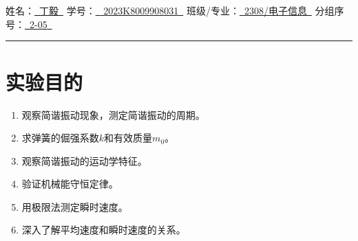 \documentclass[UTF8]{article}
\theoremstyle{MyLineTheoremStyle} %
\theoremstyle{MyBlockTheoremStyle} %
\theoremstyle{MySubsubsectionStyle} %
\begin{document}
\begin{center}\large
    \vspace*{-0.9cm}
    \\\vspace{0.5mm}
    \\\vspace{0.1cm}
    \noindent
    {
    姓名：\uline{\,\,\,丁毅\,\,\,}\hspace{0.2cm}
    学号：\uline{\,\,\,{ 2023K8009908031}\,\,\,}\hspace{0.2cm}
    班级/专业：\uline{\,\,\,{2308/电子信息}\,\,\,}\hspace{0.2cm}
    分组序号：\uline{\,\,\,{2-05}\,\,\,}
    }
    \\\vspace{0.1cm}
\end{center}
\vspace{-0.5cm}
\noindent\rule{\textwidth}{0.075em}   %
\vspace{-1.1cm}

\setcounter{tocdepth}{3}  %




\section{实验目的}
\begin{enumerate}
\item 观察简谐振动现象，测定简谐振动的周期。
\item 求弹簧的倔强系数$k$和有效质量$m_0$。
\item 观察简谐振动的运动学特征。
\item 验证机械能守恒定律。
\item 用极限法测定瞬时速度。
\item 深入了解平均速度和瞬时速度的关系。
\end{enumerate}
\end{document}
